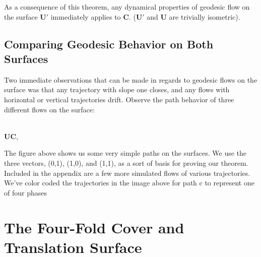 \documentclass[]{article}
\begin{document}
As a consequence of this theorem, any dynamical properties of geodesic flow on the surface $\mathbf{U}'$ immediately applies to $\mathbf{C}$. ($\mathbf{U}'$ and $\mathbf{U}$ are trivially isometric).

\subsection{Comparing Geodesic Behavior on Both Surfaces}
Two immediate observations that can be made in regards to geodesic flows on the surface was that any trajectory with slope one closes, and any flows with horizontal or vertical trajectories drift. Observe the path behavior of three different flows on the surface:

\begin{center}
 

\\ $\mathbf{U}$$\mathbf{C}$,
\\ 
\end{center}

The figure above shows us some very simple paths on the surfaces. We use the three vectors, (0,1), (1,0), and (1,1), as a sort of basis for proving our theorem. Included in the appendix are a few more simulated flows of various trajectories. We've color coded the trajectories in the image above for path c to represent one of four phases

\section{The Four-Fold Cover and Translation Surface}
\end{document}
